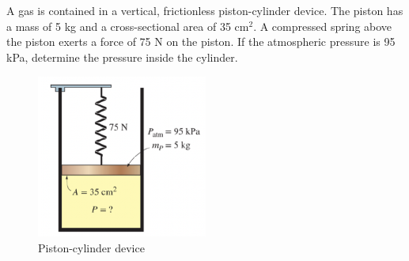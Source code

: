 \section{}
A gas is contained in a vertical, frictionless piston-cylinder device. The piston has a mass 
of 5 kg and a cross-sectional area of 35 cm$^2$. A compressed spring above the piston exerts a 
force of 75 N on the piston. If the atmospheric pressure is 95 kPa, determine the pressure inside 
the cylinder.

\begin{figure}[h]
    \centering
    \includegraphics[width=0.5\textwidth]{Questions/Figures/Q2ProblemDiagram.png}
    \caption{Piston-cylinder device}
    \label{fig:Q2ProblemDiagram}
\end{figure}
